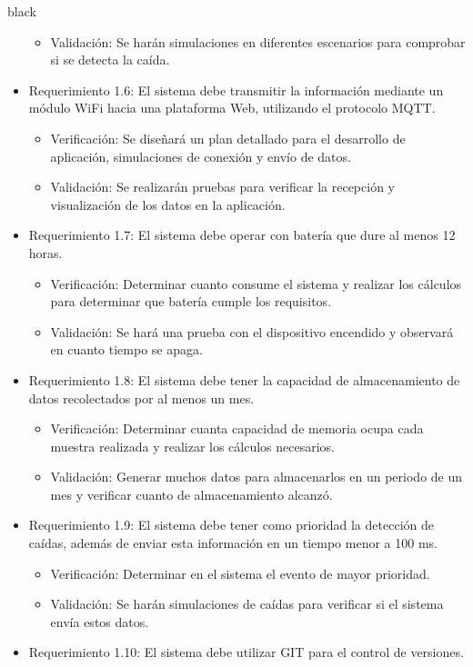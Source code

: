 \documentclass[11pt]{charter}
\begin{document}
\begin{consigna}{black}
\begin{itemize}
\begin{itemize}
\item Validación: Se harán simulaciones en diferentes escenarios para comprobar si se detecta la caída.
\end{itemize}
\item Requerimiento 1.6: El sistema debe transmitir la información mediante un módulo WiFi hacia una plataforma Web, utilizando el protocolo MQTT.
\begin{itemize}
\item Verificación: Se diseñará un plan detallado para el desarrollo de aplicación, simulaciones de conexión y envío de datos.
\item Validación: Se realizarán pruebas para verificar la recepción y visualización de los datos en la aplicación. 
\end{itemize}
\item Requerimiento 1.7: El sistema debe operar con batería que dure al menos 12 horas.
\begin{itemize}
\item Verificación: Determinar cuanto consume el sistema y realizar los cálculos para determinar que batería cumple los requisitos.
\item Validación: Se hará una prueba con el dispositivo encendido y observará en cuanto tiempo se apaga.  
\end{itemize}
\item Requerimiento 1.8: El sistema debe tener la capacidad de almacenamiento de datos recolectados por al menos un mes. 
\begin{itemize}
\item Verificación: Determinar cuanta capacidad de memoria ocupa cada muestra realizada y realizar los cálculos necesarios.
\item Validación: Generar muchos datos para almacenarlos en un periodo de un mes y verificar cuanto de almacenamiento alcanzó.   
\end{itemize}
\item Requerimiento 1.9: El sistema debe tener como prioridad la detección de caídas, además de enviar esta información en un tiempo menor a 100 ms.
\begin{itemize}
\item Verificación: Determinar en el sistema el evento de mayor prioridad.
\item Validación: Se harán simulaciones de caídas para verificar si el sistema envía estos datos.
\end{itemize}
\item Requerimiento 1.10: El sistema debe utilizar GIT para el control de versiones.

\end{itemize}
\end{consigna}
\end{document}
